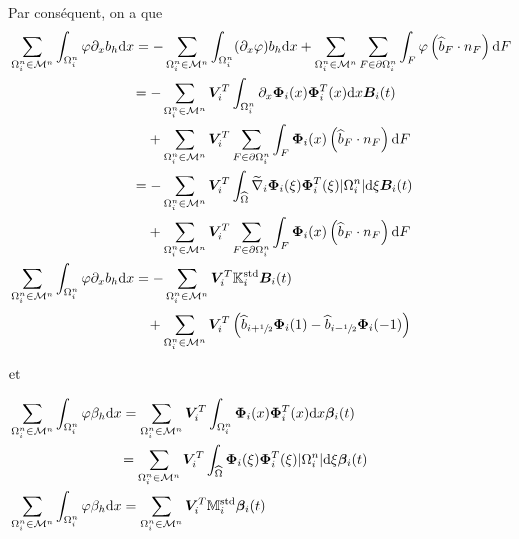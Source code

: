 \documentclass[11pt, a4paper, oneside]{report}
\begin{document}
Par conséquent, on a que
\begin{equation}
    \begin{aligned}
        &\sum_{\Omega_i^n \in \mathcal{M}^n} \int_{\Omega_i^n} \varphi \partial_x b_h \text{d}x = - \sum_{\Omega_i^n \in \mathcal{M}^n} \int_{\Omega_i^n} (\partial_x \varphi) b_h \text{d}x + \sum_{\Omega_i^n \in \mathcal{M}^n} \sum_{F \in \partial \Omega_i^n} \int_F \varphi \left( \widehat{b}_F \cdot n_F \right) \text{d}F \\
        &\phantom{\sum_{\Omega_i^n \in \mathcal{M}^n} \int_{\Omega_i^n} \varphi \partial_x b_h \text{d}x } = - \sum_{\Omega_i^n \in \mathcal{M}^n} \bm{V}_i^T \int_{\Omega_i^n} \partial_x \bm{\Phi}_i(x) \bm{\Phi}_i^T(x) \text{d}x \bm{B}_i(t) \\
        &\phantom{\sum_{\Omega_i^n \in \mathcal{M}^n} \int_{\Omega_i^n} \varphi \partial_x b_h \text{d}x = }+ \sum_{\Omega_i^n \in \mathcal{M}^n} \bm{V}_i^T \sum_{F \in \partial \Omega_i^n} \int_F \bm{\Phi}_i(x) \left( \widehat{b}_F \cdot n_F \right) \text{d}F \\
        &\phantom{\sum_{\Omega_i^n \in \mathcal{M}^n} \int_{\Omega_i^n} \varphi \partial_x b_h \text{d}x } = - \sum_{\Omega_i^n \in \mathcal{M}^n} \bm{V}_i^T \int_{\widehat{\Omega}} \widetilde{\nabla}_i \bm{\Phi}_i(\xi) \bm{\Phi}_i^T(\xi) \lvert \Omega_i^n \rvert \text{d}\xi \bm{B}_i(t) \\
        &\phantom{\sum_{\Omega_i^n \in \mathcal{M}^n} \int_{\Omega_i^n} \varphi \partial_x b_h \text{d}x = }+ \sum_{\Omega_i^n \in \mathcal{M}^n} \bm{V}_i^T \sum_{F \in \partial \Omega_i^n} \int_F \bm{\Phi}_i(x) \left( \widehat{b}_F \cdot n_F \right) \text{d}F \\
        &\sum_{\Omega_i^n \in \mathcal{M}^n} \int_{\Omega_i^n} \varphi \partial_x b_h \text{d}x = - \sum_{\Omega_i^n \in \mathcal{M}^n} \bm{V}_i^T \mathbb{K}_i^\text{std} \bm{B}_i(t) \\
        &\phantom{\sum_{\Omega_i^n \in \mathcal{M}^n} \int_{\Omega_i^n} \varphi \partial_x b_h \text{d}x = } +\sum_{\Omega_i^n \in \mathcal{M}^n} \bm{V}_i^T \left( \widehat{b}_{i+\sfrac{1}{2}} \bm{\Phi}_i(1) - \widehat{b}_{i-\sfrac{1}{2}} \bm{\Phi}_i(-1) \right)
        \\[1em]
        &\text{et}
        \\[1em]
        &\sum_{\Omega_i^n \in \mathcal{M}^n} \int_{\Omega_i^n} \varphi \beta_h \text{d}x = \sum_{\Omega_i^n \in \mathcal{M}^n} \bm{V}_i^T \int_{\Omega_i^n} \bm{\Phi}_i(x) \bm{\Phi}_i^T(x) \text{d}x \bm{\beta}_i(t) \\
        &\phantom{\sum_{\Omega_i^n \in \mathcal{M}^n} \int_{\Omega_i^n} \varphi \beta_h \text{d}x } = \sum_{\Omega_i^n \in \mathcal{M}^n} \bm{V}_i^T \int_{\widehat{\Omega}} \bm{\Phi}_i(\xi) \bm{\Phi}_i^T(\xi) \lvert \Omega_i^n \rvert \text{d}\xi \bm{\beta}_i(t) \\
        &\sum_{\Omega_i^n \in \mathcal{M}^n} \int_{\Omega_i^n} \varphi \beta_h \text{d}x = \sum_{\Omega_i^n \in \mathcal{M}^n} \bm{V}_i^T \mathbb{M}_i^\text{std} \bm{\beta}_i(t)
    \end{aligned}
\end{equation}
\end{document}
